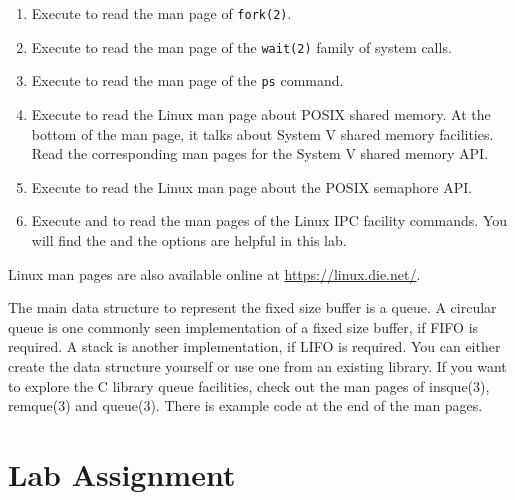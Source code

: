 \begin{enumerate}
\item Execute  to read the man page of \verb+fork(2)+.
\item Execute  to read the man page of the \verb+wait(2)+ family of system calls.
\item Execute  to read the man page of the \verb+ps+ command.
\item Execute  to read the Linux man page about POSIX shared memory. At the bottom of the man page, it talks about System V shared memory facilities. Read the corresponding man pages for the System V shared memory API.
\item Execute  to read the Linux man page about the POSIX semaphore API.
\item Execute  and  to read the man pages of the Linux IPC facility commands. You will find the  and the  options are helpful in this lab.  
\end{enumerate}
Linux man pages are also available online at \url{https://linux.die.net/}.

The main data structure to represent the fixed size buffer is a queue. A circular queue is one commonly seen implementation of a fixed size buffer, if FIFO is required. A stack is another implementation, if LIFO is required. You can either create the data structure yourself or use one from an existing library. If you want to explore the C library queue facilities, check out the man pages of insque(3), remque(3) and queue(3). There is example code at the end of the man pages.

\section{Lab Assignment}
